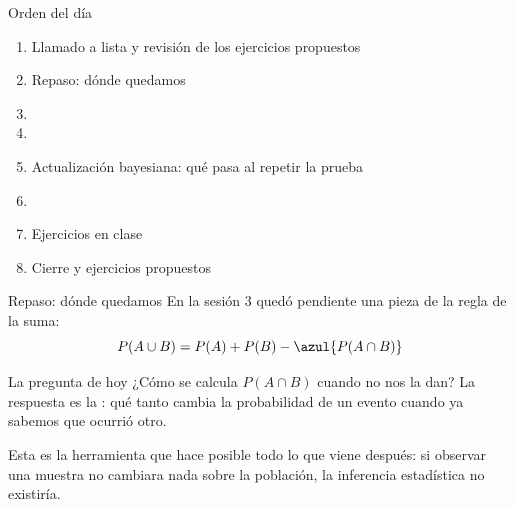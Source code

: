 \documentclass[aspectratio=169,10pt]{beamer}
\begin{document}
\portada

\begin{frame}{Orden del día}
  \begin{enumerate}
    \item Llamado a lista y revisión de los ejercicios propuestos
    \item Repaso: dónde quedamos
    \item {}
    \item {}
    \item Actualización bayesiana: qué pasa al repetir la prueba
    \item {}
    \item Ejercicios en clase
    \item Cierre y ejercicios propuestos
  \end{enumerate}
\end{frame}

\begin{frame}{Repaso: dónde quedamos}
  En la sesión 3 quedó pendiente una pieza de la regla de la suma:
  \[ P(A\cup B)=P(A)+P(B)-\azul{P(A\cap B)} \]

  \vspace{0.2cm}
  \begin{alertblock}{La pregunta de hoy}
    \footnotesize
    ¿Cómo se calcula $P(A\cap B)$ cuando no nos la dan? La respuesta es la
    : qué tanto cambia la probabilidad de un
    evento cuando ya sabemos que ocurrió otro.
  \end{alertblock}

  \vspace{0.2cm}
  {\footnotesize\color{uniGris} Esta es la herramienta que hace posible todo lo
  que viene después: si observar una muestra no cambiara nada sobre la
  población, la inferencia estadística no existiría.}
\end{frame}

\end{document}
